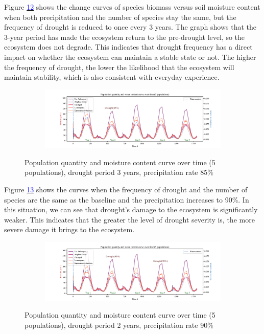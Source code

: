 \documentclass{mcmthesis}
\begin{document}
Figure \hyperref[fig:5_1_85]{\textcolor{blue}{12}} shows the change curves of species biomass versus soil moisture content when both precipitation and the number of species stay the same, but the frequency of drought is reduced to once every $3$ years. The graph shows that the 3-year period has made the ecosystem return to the pre-drought level, so the ecosystem does not degrade. This indicates that drought frequency has a direct impact on whether the ecosystem can maintain a stable state or not. The higher the frequency of drought, the lower the likelihood that the ecosystem will maintain stability, which is also consistent with everyday experience.

\begin{figure}[h]
\centering 
\begin{subfigure}{ 0.95\textwidth}
\includegraphics[width=\textwidth]{img/5_1_85.pdf}
\end{subfigure}
\caption{Population quantity and moisture content curve over time (5 populations), drought period $3$ years, precipitation rate 85\%}
\label{fig:5_1_85}
\end{figure}

Figure \hyperref[fig:5_2_90]{\textcolor{blue}{13}} shows the curves when the frequency of drought and the number of species are the same as the baseline and the precipitation increases to 90\%. In this situation, we can see that drought's damage to the ecosystem is significantly weaker. This indicates that the greater the level of drought severity is, the more severe damage it brings to the ecosystem.

\begin{figure}[h]
\centering 
\begin{subfigure}{ 0.95\textwidth}
\includegraphics[width=\textwidth]{img/5_2_90.pdf}
\end{subfigure}
\caption{Population quantity and moisture content curve over time (5 populations), drought period 2 years, precipitation rate 90\%}
\label{fig:5_2_90}
\end{figure}
\end{document}
